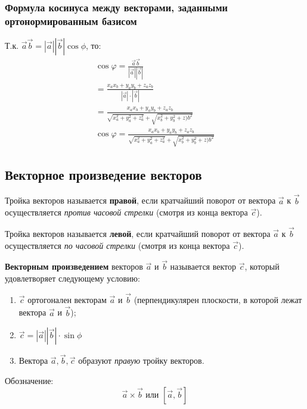 \begin{center}
\end{center}


\subsubsection{Формула косинуса между векторами, заданными ортонормированным базисом}

Т.к. $\vec{a} \vec{b} = |\vec{a}| |\vec{b}| \cos \phi$, то:
\begin{gather*}
  \cos \varphi = \frac{\vec{a} \vec{b}}{|\vec{a}| |\vec{b}|} \\
  = \frac{x_a x_b + y_a y_b + z_a z_b}{|\vec{a}| \cdot |\vec{b}|} \\
  = \frac{x_a x_b + y_a y_b + z_a z_b}{\sqrt{x_a^2 + y_a^2 + z_a^2} +\sqrt{x_b^2 + y_b^2 + z)b^2} } \\
  \boxed{\cos \varphi = \frac{x_a x_b + y_a y_b + z_a z_b}{\sqrt{x_a^2 + y_a^2 + z_a^2} +\sqrt{x_b^2 + y_b^2 + z)b^2}}}
\end{gather*}


\subsection{Векторное произведение векторов}

\begin{definition}
  Тройка векторов называется \textbf{правой}, если кратчайший поворот от вектора $\vec{a}$ к $\vec{b}$ осуществляется \textit{против часовой стрелки} (смотря из конца вектора $\vec{c}$).
\end{definition}

\begin{definition}
  Тройка векторов называется \textbf{левой}, если кратчайший поворот от вектора $\vec{a}$ к $\vec{b}$ осуществляется \textit{по часовой стрелки} (смотря из конца вектора $\vec{c}$).
\end{definition}

\begin{definition}
  \textbf{Векторным произведением} векторов $\vec{a}$ и $\vec{b}$ называется вектор $\vec{c}$, который удовлетворяет следующему условию:
  \begin{enumerate}
    \item $\vec{c}$ ортогонален векторам $\vec{a}$ и $\vec{b}$ (перпендикулярен плоскости, в которой лежат вектора $\vec{a}$ и $\vec{b}$);
    \item $\vec{c} = |\vec{a}| |\vec{b}| \cdot \sin \phi$
    \item Вектора $\vec{a}, \vec{b}, \vec{c}$ образуют \textit{правую} тройку векторов.
  \end{enumerate}
  Обозначение: \[
    \vec{a} \times \vec{b} \text{ или } [\vec{a}, \vec{b}]
  \] 
\end{definition}

